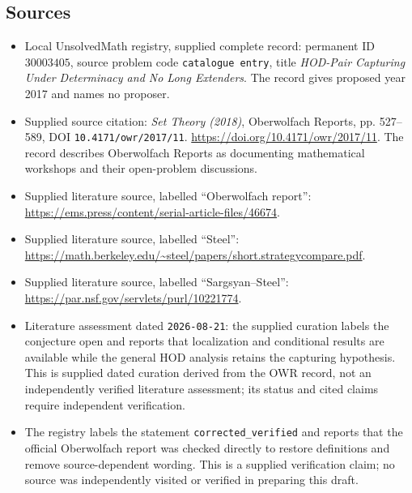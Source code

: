 \documentclass[11pt]{article}
\begin{document}
\subsection{Sources}
\begin{itemize}
\item Local UnsolvedMath registry, supplied complete record: permanent ID \(30003405\), source problem code \texttt{catalogue entry}, title \emph{HOD-Pair Capturing Under Determinacy and No Long Extenders}. The record gives proposed year 2017 and names no proposer.
\item Supplied source citation: \emph{Set Theory (2018)}, Oberwolfach Reports, pp. 527--589, DOI \texttt{10.4171/owr/2017/11}. \url{https://doi.org/10.4171/owr/2017/11}. The record describes Oberwolfach Reports as documenting mathematical workshops and their open-problem discussions.
\item Supplied literature source, labelled ``Oberwolfach report'': \url{https://ems.press/content/serial-article-files/46674}.
\item Supplied literature source, labelled ``Steel'': \url{https://math.berkeley.edu/~steel/papers/short.strategycompare.pdf}.
\item Supplied literature source, labelled ``Sargsyan--Steel'': \url{https://par.nsf.gov/servlets/purl/10221774}.
\item Literature assessment dated \texttt{2026-08-21}: the supplied curation labels the conjecture open and reports that localization and conditional results are available while the general HOD analysis retains the capturing hypothesis. This is supplied dated curation derived from the OWR record, not an independently verified literature assessment; its status and cited claims require independent verification.
\item The registry labels the statement \texttt{corrected\_verified} and reports that the official Oberwolfach report was checked directly to restore definitions and remove source-dependent wording. This is a supplied verification claim; no source was independently visited or verified in preparing this draft.
\end{itemize}
\end{document}
